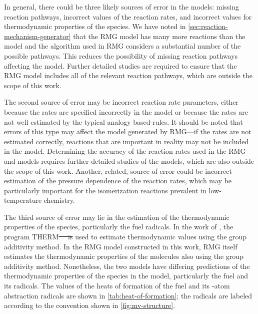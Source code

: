\documentclass[letterpaper, review, sort&compress]{elsarticle}
\providecommand{\DIFadd}[1]{{\protect\color{blue}\uwave{#1}}} %
\providecommand{\DIFdel}[1]{{\protect\color{red}\sout{#1}}}                      %
\providecommand{\DIFaddbegin}{} %
\providecommand{\DIFaddend}{} %
\providecommand{\DIFdelbegin}{} %
\providecommand{\DIFdelend}{} %
\newcommand{\DIFscaledelfig}{0.5}
\newlength{\DIFdelgraphicswidth} %
\newlength{\DIFdelgraphicsheight} %
\newcommand{\DIFaddincludegraphics}[2][]{{\color{blue}\fbox{\DIFOincludegraphics[#1]{#2}}}} %
\newcommand{\DIFdelincludegraphics}[2][]{%
\sbox{\DIFdelgraphicsbox}{\DIFOincludegraphics[#1]{#2}}%
\settoboxwidth{\DIFdelgraphicswidth}{\DIFdelgraphicsbox} %
\settoboxtotalheight{\DIFdelgraphicsheight}{\DIFdelgraphicsbox} %
\scalebox{\DIFscaledelfig}{%
\parbox[b]{\DIFdelgraphicswidth}{\usebox{\DIFdelgraphicsbox}\\[-\baselineskip] \rule{\DIFdelgraphicswidth}{0em}}\llap{\resizebox{\DIFdelgraphicswidth}{\DIFdelgraphicsheight}{%
\setlength{\unitlength}{\DIFdelgraphicswidth}%
\begin{picture}(1,1)%
\thicklines\linethickness{2pt} %
{\color[rgb]{1,0,0}\put(0,0){\framebox(1,1){}}}%
{\color[rgb]{1,0,0}\put(0,0){\line( 1,1){1}}}%
{\color[rgb]{1,0,0}\put(0,1){\line(1,-1){1}}}%
\end{picture}%
}\hspace*{3pt}}} %
} %
\DeclareRobustCommand{\DIFaddbegin}{\DIFOaddbegin \let\includegraphics\DIFaddincludegraphics} %
\DeclareRobustCommand{\DIFaddend}{\DIFOaddend \let\includegraphics\DIFOincludegraphics} %
\DeclareRobustCommand{\DIFdelbegin}{\DIFOdelbegin \let\includegraphics\DIFdelincludegraphics} %
\DeclareRobustCommand{\DIFdelend}{\DIFOaddend \let\includegraphics\DIFOincludegraphics} %
\begin{document}
In general, there could be three likely sources of error in the models: missing reaction pathways,
incorrect values of the reaction rates, and incorrect values for thermodynamic properties of the
species. We have noted in \cref{sec:reaction-mechanism-generator} that the RMG model has many more
reactions than the \citet{Dievart2013} model and the algorithm used in RMG considers a substantial
number of the possible pathways. This reduces the possibility of missing reaction pathways affecting
the model. Further detailed studies are required to ensure that the RMG model includes all of the
relevant reaction pathways, which are outside the scope of this work.

The second source of error may be incorrect reaction rate parameters, either because the rates are
specified incorrectly in the model or because the rates are not well estimated by the
typical analogy based-rules. It should be noted that errors of this type may affect the model
generated by RMG---if the rates are not estimated correctly, reactions that are important in reality
may not be included in the model. Determining the accuracy of the reaction rates used in the RMG and
\citet{Dievart2013} models requires further detailed studies of the models, which are also outside
the scope of this work. Another, related, source of error could be incorrect estimation of the
pressure dependence of the reaction rates, which may be particularly important for the isomerization
reactions prevalent in low-temperature chemistry.

The third source of error may lie in the estimation of the thermodynamic properties of the species,
particularly the fuel radicals. In the work of \citet{Dievart2013}, the program
THERM\DIFdelbegin \DIFdel{\mbox{%
\cite{Ritter1991} }\hspace{0pt}%
is }\DIFdelend \DIFaddbegin \DIFadd{~\mbox{%
\cite{Ritter1991} }\hspace{0pt}%
was }\DIFaddend used to estimate thermodynamic values using the group additivity method.
In the RMG model constructed in this work, RMG itself estimates the thermodynamic properties of the
molecules also using the group additivity method. Nonetheless, the two models have differing
predictions of the thermodynamic properties of the species in the model, particularly the fuel and
its radicals. The values of the heats of formation of the fuel and its -atom abstraction
radicals are shown in \cref{tab:heat-of-formation}; the radicals are labeled according to the
convention shown in \cref{fig:mv-structure}.
\end{document}

